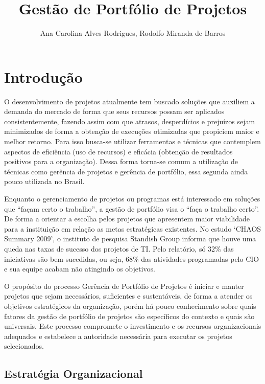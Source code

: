 \documentclass[a4paper,10pt]{article}
\title{Gestão de Portfólio de Projetos}
\author{Ana Carolina Alves Rodrigues, Rodolfo Miranda de Barros}
\begin{document}
\maketitle

\begin{abstract}

\end{abstract}

\section{Introdução}
\flushleft
O desenvolvimento de projetos atualmente tem buscado soluções que auxiliem a demanda do mercado de forma que seus recursos possam ser aplicados
consistentemente, fazendo assim com que atrasos, desperdícios e prejuízos sejam minimizados de forma a obtenção de execuções otimizadas que propiciem maior e melhor retorno. 
Para isso busca-se utilizar ferramentas e técnicas que contemplem aspectos de eficiência (uso de recursos) e eficácia (obtenção de resultados positivos para a organização).
Dessa forma torna-se comum a utilização de técnicas como gerência de projetos e gerência de portfólio, essa segunda ainda pouco utilizada no Brasil.

\flushleft
Enquanto o gerenciamento de projetos ou programas está interessado em soluções que ``façam certo o trabalho'', a gestão de portfólio visa o ``faça o trabalho certo''.\cite{sppm} 
De forma a orientar a escolha pelos projetos que apresentem maior viabilidade para a instituição em relação as metas estratégicas existentes. No estudo ‘CHAOS Summary 2009’, 
o instituto de pesquisa Standish Group informa que houve uma queda nas taxas de sucesso dos projetos de TI. 
Pelo relatório, só 32\% das iniciativas são bem-sucedidas, ou seja, 68\% das atividades programadas pelo CIO e sua equipe acabam não atingindo os objetivos.

\flushleft
O propósito do processo Gerência de Portfólio de Projetos é iniciar e manter projetos que sejam necessários, suficientes e sustentáveis, de forma a atender
os objetivos estratégicos da organização, porém há pouco conhecimento sobre quais fatores da gestão de portfólio de projetos são específicos do contexto e quais são universais. 
Este processo compromete o investimento e os recursos organizacionais adequados e 
estabelece a autoridade necessária para executar os projetos selecionados.\cite{mps}


\subsection{Estratégia Organizacional}
\end{document}
